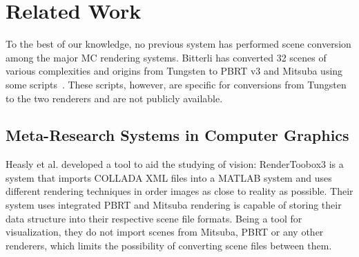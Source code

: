 \section{Related Work}
\label{(sec:related_work)}

To the best of our knowledge, no previous system has performed scene conversion among the major MC rendering systems. 
Bitterli has converted 32 scenes of various complexities and origins from Tungsten to PBRT v3 and Mitsuba using some scripts~\cite{tungsten}. These scripts, however, are specific for conversions from Tungsten to the two renderers and are not publicly available. 



\subsection{Meta-Research Systems in Computer Graphics}

Heasly et al. developed a tool to aid the studying of vision: RenderToobox3 
\cite{rendertoolbox} is a system that imports COLLADA XML files into a MATLAB 
system and uses different rendering techniques in order images as close to 
reality as possible. Their system uses integrated PBRT and Mitsuba rendering is 
capable of storing their data structure into their respective scene file 
formats. Being a tool for visualization, they do not import scenes from Mitsuba, 
PBRT or any other renderers, which limits the possibility of converting scene 
files between them. 

%
%


